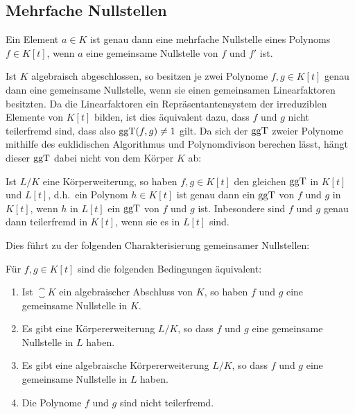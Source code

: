 \subsection{Mehrfache Nullstellen}

\begin{lemma}
  Ein Element $a \in K$ ist genau dann eine mehrfache Nullstelle eines Polynoms $f \in K[t]$, wenn $a$ eine gemeinsame Nullstelle von $f$ und $f'$ ist.
\end{lemma}

Ist $K$ algebraisch abgeschlossen, so besitzen je zwei Polynome $f, g \in K[t]$ genau dann eine gemeinsame Nullstelle, wenn sie einen gemeinsamen Linearfaktoren besitzten.
Da die Linearfaktoren ein Repräsentantensystem der irreduziblen Elemente von $K[t]$ bilden, ist dies äquivalent dazu, dass $f$ und $g$ nicht teilerfremd sind, dass also $\operatorname{ggT}(f,g) \neq 1$ gilt.
Da sich der $\operatorname{ggT}$ zweier Polynome mithilfe des euklidischen Algorithmus und Polynomdivison berechen lässt, hängt dieser $\operatorname{ggT}$ dabei nicht von dem Körper $K$ ab:

\begin{lemma}
  Ist $L/K$ eine Körperweiterung, so haben $f, g \in K[t]$ den gleichen $\operatorname{ggT}$ in $K[t]$ und $L[t]$, d.h.\ ein Polynom $h \in K[t]$ ist genau dann ein $\operatorname{ggT}$ von $f$ und $g$ in $K[t]$, wenn $h$ in $L[t]$ ein $\operatorname{ggT}$ von $f$ und $g$ ist.
  Inbesondere sind $f$ und $g$ genau dann teilerfremd in $K[t]$, wenn sie es in $L[t]$ sind.
\end{lemma}

Dies führt zu der folgenden Charakterisierung gemeinsamer Nullstellen:

\begin{corollary}
  Für $f, g \in K[t]$ sind die folgenden Bedingungen äquivalent:
  \begin{enumerate}
    \item
      Ist $\closure{K}$ ein algebraischer Abschluss von $K$, so haben $f$ und $g$ eine gemeinsame Nullstelle in $K$.
    \item
      Es gibt eine Körpererweiterung $L/K$, so dass $f$ und $g$ eine gemeinsame Nullstelle in $L$ haben.
    \item
      Es gibt eine algebraische Körpererweiterung $L/K$, so dass $f$ und $g$ eine gemeinsame Nullstelle in $L$ haben.
    \item
      Die Polynome $f$ und $g$ sind nicht teilerfremd.
  \end{enumerate}
\end{corollary}

